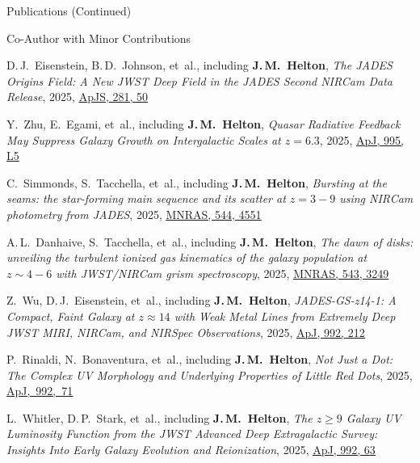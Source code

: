 \documentclass{JMH_CV}
\begin{document}
\begin{rSection}{Publications (Continued)}
\begin{rSubsection}{Co-Author with Minor Contributions}{}{}{}
\begin{etaremune}
    \item D.\,J.~Eisenstein, B.\,D.~Johnson, et~al., including \textbf{J.\,M.~Helton}, \textit{The JADES Origins Field: A New JWST Deep Field in the JADES Second NIRCam Data Release}, 2025, \href{https://www.scixplorer.org/abs/2025ApJS..281...50E/abstract}{\ul{ApJS, 281, 50}}

    \item Y.~Zhu, E.~Egami, et~al., including \textbf{J.\,M.~Helton}, \textit{Quasar Radiative Feedback May Suppress Galaxy Growth on Intergalactic Scales at $\mathit{z = 6.3}$}, 2025, \href{https://www.scixplorer.org/abs/2025ApJ...995L...5Z/abstract}{\ul{ApJ, 995, L5}}

    \item C.~Simmonds, S.~Tacchella, et~al., including \textbf{J.\,M.~Helton}, \textit{Bursting at the seams: the star-forming main sequence and its scatter at $\mathit{z = 3-9}$ using NIRCam \mbox{photometry} from JADES}, 2025, \href{https://www.scixplorer.org/abs/2025MNRAS.544.4551S/abstract}{\ul{MNRAS, 544, 4551}}

    \item A.\,L.~Danhaive, S.~Tacchella, et~al., including \textbf{J.\,M.~Helton}, \textit{The dawn of disks: unveiling the turbulent ionized gas kinematics of the galaxy population at $\mathit{z \sim 4-6}$ with JWST/NIRCam grism spectroscopy}, 2025, \href{https://www.scixplorer.org/abs/2025MNRAS.543.3249D/abstract}{\ul{MNRAS, 543, 3249}}

    \item Z.~Wu, D.\,J.~Eisenstein, et~al., including \textbf{J.\,M.~Helton}, \textit{JADES-GS-z14-1: A \mbox{Compact}, Faint Galaxy at $\mathit{z \approx 14}$ with Weak Metal Lines from Extremely Deep JWST MIRI, NIRCam, and NIRSpec Observations}, 2025, \href{https://www.scixplorer.org/abs/2025ApJ...992..212W/abstract}{\ul{ApJ, 992, 212}}

    \item P.~Rinaldi, N.~Bonaventura, et~al., including \textbf{J.\,M.~Helton}, \textit{Not Just a Dot: The Complex UV Morphology and Underlying Properties of Little Red Dots}, 2025, \href{https://www.scixplorer.org/abs/2025ApJ...992...71R/abstract}{\ul{\mbox{ApJ, 992, 71}}}

    \item L.~Whitler, D.\,P.~Stark, et~al., including \textbf{J.\,M.~Helton}, \textit{The $\mathit{z \geq 9}$ Galaxy UV \mbox{Luminosity} Function from the JWST Advanced Deep Extragalactic Survey: Insights Into Early Galaxy Evolution and Reionization}, 2025, \href{https://www.scixplorer.org/abs/2025ApJ...992...63W/abstract}{\ul{ApJ, 992, 63}}


\end{etaremune}
\end{rSubsection}
\end{rSection}
\end{document}
